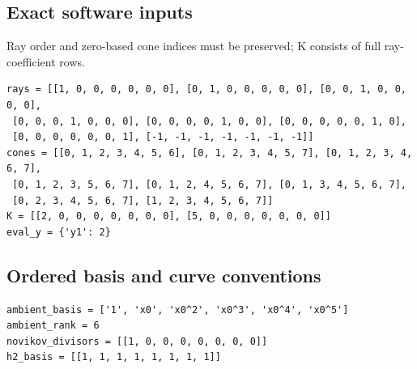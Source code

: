 \documentclass[10pt,a4paper]{article}
\begin{document}
\subsection*{Exact software inputs}
Ray order and zero-based cone indices must be preserved; K consists of full ray-coefficient rows.
\begin{lstlisting}
rays = [[1, 0, 0, 0, 0, 0, 0], [0, 1, 0, 0, 0, 0, 0], [0, 0, 1, 0, 0, 0, 0],
 [0, 0, 0, 1, 0, 0, 0], [0, 0, 0, 0, 1, 0, 0], [0, 0, 0, 0, 0, 1, 0],
 [0, 0, 0, 0, 0, 0, 1], [-1, -1, -1, -1, -1, -1, -1]]
cones = [[0, 1, 2, 3, 4, 5, 6], [0, 1, 2, 3, 4, 5, 7], [0, 1, 2, 3, 4, 6, 7],
 [0, 1, 2, 3, 5, 6, 7], [0, 1, 2, 4, 5, 6, 7], [0, 1, 3, 4, 5, 6, 7],
 [0, 2, 3, 4, 5, 6, 7], [1, 2, 3, 4, 5, 6, 7]]
K = [[2, 0, 0, 0, 0, 0, 0, 0], [5, 0, 0, 0, 0, 0, 0, 0]]
eval_y = {'y1': 2}
\end{lstlisting}
\subsection*{Ordered basis and curve conventions}
\begin{lstlisting}
ambient_basis = ['1', 'x0', 'x0^2', 'x0^3', 'x0^4', 'x0^5']
ambient_rank = 6
novikov_divisors = [[1, 0, 0, 0, 0, 0, 0, 0]]
h2_basis = [[1, 1, 1, 1, 1, 1, 1, 1]]
\end{lstlisting}
\end{document}
